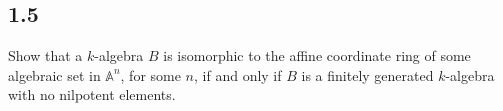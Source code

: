     \subsection*{1.5}

    Show that a $k$-algebra $B$ is isomorphic to the affine coordinate ring of some algebraic set in $\mathbb{A}^n$, for some $n$, if and only if $B$ is a finitely generated $k$-algebra with no nilpotent elements.

